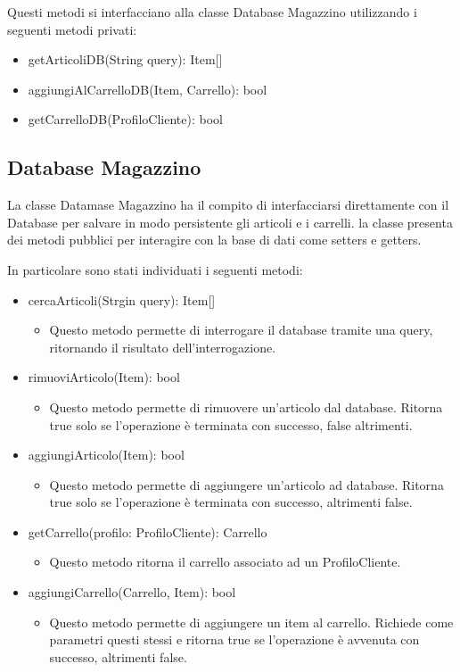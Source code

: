 \documentclass{report}
\begin{document}
Questi metodi si interfacciano alla classe Database Magazzino utilizzando i seguenti metodi privati:
\begin{itemize}
	\item getArticoliDB(String query): Item[]
	\item aggiungiAlCarrelloDB(Item, Carrello): bool
	\item getCarrelloDB(ProfiloCliente): bool
\end{itemize}

\subsection*{Database Magazzino}

La classe Datamase Magazzino ha il compito di interfacciarsi direttamente con il Database per salvare in modo persistente gli articoli e i carrelli. la classe presenta dei metodi pubblici per interagire con la base di dati come setters e getters. 

In particolare sono stati individuati i seguenti metodi:


\begin{itemize}
	\item cercaArticoli(Strgin query): Item[]
	\begin{itemize}
		\item Questo metodo permette di interrogare il database tramite una query, ritornando il risultato dell'interrogazione. 
	\end{itemize}
	\item rimuoviArticolo(Item): bool
	\begin{itemize}
		\item Questo metodo permette di rimuovere un'articolo dal database. Ritorna true solo se l'operazione è terminata con successo, false altrimenti.
	\end{itemize}
	\item aggiungiArticolo(Item): bool
	\begin{itemize}
		\item Questo metodo permette di aggiungere un'articolo ad database. Ritorna true solo se l'operazione è terminata con successo, altrimenti false.
	\end{itemize}
	\item getCarrello(profilo: ProfiloCliente): Carrello
	\begin{itemize}
		\item Questo metodo ritorna il carrello associato ad un ProfiloCliente.
	\end{itemize}
	\item aggiungiCarrello(Carrello, Item): bool
	\begin{itemize}
		\item Questo metodo permette di aggiungere un item al carrello. Richiede come parametri questi stessi e ritorna true se l'operazione è avvenuta con successo, altrimenti false.
	\end{itemize}
	
\end{itemize}
\end{document}
